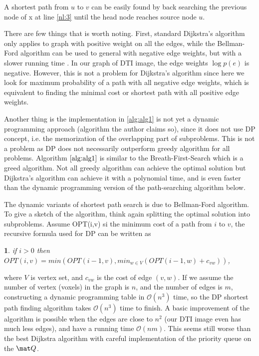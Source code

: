 \documentclass[12pt]{article}
\newtheorem*{mythm}{}
\begin{document}
A shortest path from $u$ to $v$ can be easily found by back searching the
previous node of x at line \ref{nl:3} until the head node reaches source node
$u$.


There are few things that is worth noting. First, standard Dijkstra's algorithm only
applies to graph with positive weight on all the edges, while the Bellman-Ford
algorithm can be used to general with negative edge weights, but with a slower
running time \citep[ch 24]{cormen2001introduction}.  In our graph of DTI image,
the edge weights  $\log p(e)$ is negative. However, this is not a problem
for Dijkstra's algorithm since here we look for maximum probability of a
path with all negative edge weights, which is equivalent to finding the minimal cost or shortest path with all positive edge weights.

Another thing is the implementation in \ref{alg:alg1} is not yet a dynamic
programming approach (algorithm the author claims so), since it does not use DP
concept, i.e. the memorization of the overlapping part of subproblems. This is
not a problem as DP does not necessarily outperform greedy algorithm for all
problems. Algorithm $\ref{alg:alg1}$ is similar to the Breath-First-Search which
is a greed algorithm. Not all greedy algorithm can achieve the optimal solution
but Dijkstra's algorithm can achieve it with a polynomial time, and is even
faster than the dynamic programming version of the path-searching algorithm
below.

The dynamic variants of shortest path search is due to Bellman-Ford
algorithm. To give a sketch of the algorithm, think again splitting the optimal
solution into subproblems. Assume \textsf{OPT(i,v)} si the minimum cost of a
path from $i$ to $v$, the recursive formula used for DP can be written as
\citep[chap 6.8]{kleinberg2006algorithm}
\begin{mythm}
  if $i > 0$ then $OPT(i,v) = min(OPT(i-1, v), min_{w\in V}(OPT(i-1,w) + c_{vw}))$,
\end{mythm}
where $V$ is vertex set, and $c_{vw}$ is the cost of edge $(v,w)$. If we assume
the number of vertex (voxels) in the graph is $n$, and the number of edges is
$m$, constructing a dynamic programming table in $\mathcal{O}(n^3)$ time, so the DP
shortest path finding algorithm takes $\mathcal{O}(n^3)$ time to finish. A basic
improvement of the algorithm is possible when the edges are close to $n^2$ (our
DTI image even has much less edges), and have a running time
$\mathcal{O}(nm)$. This seems still worse than the best Dijkstra algorithm with
careful implementation of the priority queue on the $\mat Q$.
\end{document}
